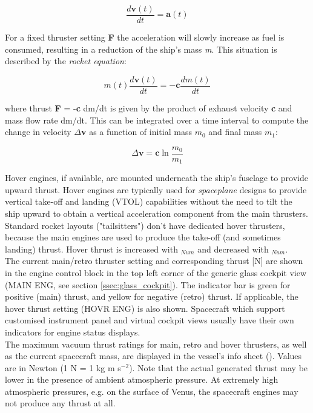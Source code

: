 \documentclass[Orbiter User Manual.tex]{subfiles}
\begin{document}
\[ \frac{d\textbf{v}(t)}{dt} = \textbf{a}(t) \]

\noindent
For a fixed thruster setting \textbf{F} the acceleration will slowly increase as fuel is consumed, resulting in a reduction of the ship's mass \textit{m}. This situation is described by the \textit{rocket equation}:

\[ m(t) \frac{d\textbf{v}(t)}{dt} = - \textbf{c} \frac{dm(t)}{dt} \]

\noindent
where thrust \textbf{F} = -\textbf{c} dm/dt is given by the product of exhaust velocity \textbf{c} and mass flow rate dm/dt. This can be integrated over a time interval to compute the change in velocity $\Delta$\textbf{v} as a function of initial mass $m_{0}$ and final mass $m_{1}$:


\[ \Delta \textbf{v} = \textbf{c} \ln \frac{m_{0}}{m_{1}} \]

\noindent
Hover engines, if available, are mounted underneath the ship's fuselage to provide upward thrust. Hover engines are typically used for \textit{spaceplane} designs to provide vertical take-off and landing (VTOL) capabilities without the need to tilt the ship upward to obtain a vertical acceleration component from the main thrusters. Standard rocket layouts ("tailsitters") don't have dedicated hover thrusters, because the main engines are used to produce the take-off (and sometimes landing) thrust. Hover thrust is increased with $_{Num}$ and decreased with $_{Num}$.\\
The current main/retro thruster setting and corresponding thrust [N] are shown in the engine control block in the top left corner of the generic glass cockpit view (MAIN ENG, see section \ref{ssec:glass_cockpit}). The indicator bar is green for positive (main) thrust, and yellow for negative (retro) thrust. If applicable, the hover thrust setting (HOVR ENG) is also shown. Spacecraft which support customised instrument panel and virtual cockpit views usually have their own indicators for engine status displays.\\
The maximum vacuum thrust ratings for main, retro and hover thrusters, as well as the current spacecraft mass, are displayed in the vessel's info sheet (\Ctrl{}). Values are in Newton (1 N = 1 kg m s$^{-2}$). Note that the actual generated thrust may be lower in the presence of ambient atmospheric pressure. At extremely high atmospheric pressures, e.g. on the surface of Venus, the spacecraft engines may not produce any thrust at all.
\end{document}
